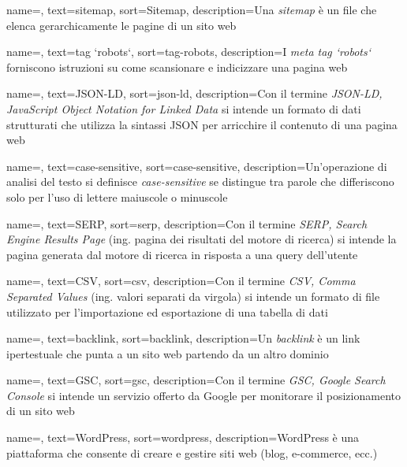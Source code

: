  {
    name=,
    text=sitemap,
    sort=Sitemap,
    description={Una \emph{sitemap} è un file che elenca gerarchicamente le pagine di un sito web}
}

 {
    name=,
    text=tag `robots`,
    sort=tag-robots,
    description={I \emph{meta tag `robots`} forniscono istruzioni su come scansionare e indicizzare una pagina web}
}

 {
    name=,
    text=JSON-LD,
    sort=json-ld,
    description={Con il termine \emph{JSON-LD, JavaScript Object Notation for Linked Data} si intende un formato di dati strutturati che utilizza la sintassi JSON per arricchire il contenuto di una pagina web}
}

 {
    name=,
    text=case-sensitive,
    sort=case-sensitive,
    description={Un’operazione di analisi del testo si definisce \emph{case-sensitive} se distingue tra parole che differiscono solo per l’uso di lettere maiuscole o minuscole}
}

 {
    name=,
    text=SERP,
    sort=serp,
    description={Con il termine \emph{SERP, Search Engine Results Page} (ing. pagina dei risultati del motore di ricerca) si intende la pagina generata dal motore di ricerca in risposta a una query dell'utente}
}

 {
    name=,
    text=CSV,
    sort=csv,
    description={Con il termine \emph{CSV, Comma Separated Values} (ing. valori separati da virgola) si intende un formato di file utilizzato per l'importazione ed esportazione di una tabella di dati}
}

 {
    name=,
    text=backlink,
    sort=backlink,
    description={Un \emph{backlink} è un link ipertestuale che punta a un sito web partendo da un altro dominio}
}

 {
    name=,
    text=GSC,
    sort=gsc,
    description={Con il termine \emph{GSC, Google Search Console} si intende un servizio offerto da Google per monitorare il posizionamento di un sito web}
}

 {
    name=,
    text=WordPress,
    sort=wordpress,
    description={WordPress è una piattaforma che consente di creare e gestire siti web (blog, e-commerce, ecc.)}
}

